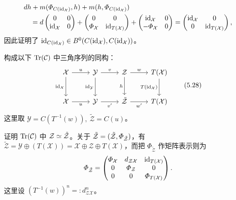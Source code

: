 \[
\begin{aligned}
  & dh + m(\varPhi_{C(\mathrm{id}_{\mathcal{X}})},h) + m(h,\varPhi_{C(\mathrm{id}_{\mathcal{X}})})\\
  &\quad =
  d\begin{pmatrix}0&0\\ \mathrm{id}_{\mathcal{X}}&0\end{pmatrix}
  + \begin{pmatrix}0&0\\ \varPhi_{\mathcal{X}}&\mathrm{id}_{T(\mathcal{X})}\end{pmatrix}
  + \begin{pmatrix}\mathrm{id}_{\mathcal{X}}&0\\ -\varPhi_{\mathcal{X}}&0\end{pmatrix}
  = \begin{pmatrix}\mathrm{id}_{\mathcal{X}}&0\\ 0&\mathrm{id}_{T(\mathcal{X})}\end{pmatrix},
\end{aligned}
\]
因此证明了 $\mathrm{id}_{C(\mathrm{id}_{\mathcal{X}})} \in B^{0}(C(\mathrm{id}_{\mathcal{X}}),C(\mathrm{id}_{\mathcal{X}}))$。

 构成以下 $\operatorname{Tr}(\mathcal{C})$ 中三角序列的同构：
\begin{equation}
\begin{tikzcd}[row sep=2.4em, column sep=2.6em]
  \cX \arrow[r,"u"] \arrow[d,"\id_{\cX}"'] & \mathcal{Y} \arrow[r,"v"] \arrow[d,"\id_{\mathcal{Y}}"'] & \cZ \arrow[r,"w"] \arrow[d,"h"'] & T(\cX) \arrow[d,"T(\id_{\cX})"']\\
  \cX \arrow[r,"u"'] & \mathcal{Y} \arrow[r,"v'"'] & \tilde{\mathcal{Z}} \arrow[r,"w'"'] & T(\cX)
\end{tikzcd}
\tag{5.28}
\end{equation}
这里取 $\mathcal{Y} = C(T^{-1}(w)),\ \tilde{\mathcal{Z}} = C(u)$。

证明 $\operatorname{Tr}(\mathcal{C})$ 中 $\mathcal{Z} \simeq \tilde{\mathcal{Z}}$。关于 $\tilde{\mathcal{Z}} = (\tilde{\mathcal{Z}}, \varPhi_{\tilde{\mathcal{Z}}})$，有 $\tilde{\mathcal{Z}} = \mathcal{Y}\oplus(T(\mathcal{X})) = \mathcal{X}\oplus\mathcal{Z}\oplus T(\mathcal{X})$，而把 $\varPhi_{\tilde{\mathcal{Z}}}$ 作矩阵表示则为
\[
  \varPhi_{\tilde{\mathcal{Z}}} =
  \begin{pmatrix}
    \varPhi_{\mathcal{X}} & d_{\mathcal{Z}\mathcal{X}} & \mathrm{id}_{T(\mathcal{X})}\\
    0 & \varPhi_{\mathcal{Z}} & 0\\
    0 & 0 & \varPhi_{T(\mathcal{X})}
  \end{pmatrix}.
\]
这里设 $(T^{-1}(w))^{n} =: d^{n}_{\mathcal{Z}\mathcal{X}}$。

